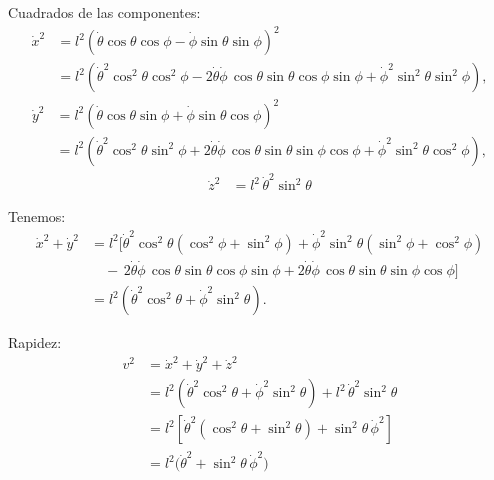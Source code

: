 \documentclass{article}
\begin{document}
Cuadrados de las componentes:
\begin{equation}
\begin{split}
\dot x^2
&= l^2\!\left(\dot\theta\cos\theta\cos\phi - \dot\phi\sin\theta\sin\phi\right)^2\\
&= l^2\!\left(
\dot\theta^2\cos^2\theta\cos^2\phi
-2\dot\theta\dot\phi\,\cos\theta\sin\theta\cos\phi\sin\phi
+\dot\phi^2\sin^2\theta\sin^2\phi
\right),
\end{split}\label{eq:xdot2}
\end{equation}
\begin{equation}
\begin{split}
\dot y^2
&= l^2\!\left(\dot\theta\cos\theta\sin\phi + \dot\phi\sin\theta\cos\phi\right)^2\\
&= l^2\!\left(
\dot\theta^2\cos^2\theta\sin^2\phi
+2\dot\theta\dot\phi\,\cos\theta\sin\theta\sin\phi\cos\phi
+\dot\phi^2\sin^2\theta\cos^2\phi
\right),
\end{split}\label{eq:ydot2}
\end{equation}
\begin{equation}
\begin{split}
\dot z^2
&= l^2\,\dot\theta^2\sin^2\theta 
\end{split}\label{eq:zdot2}
\end{equation}

Tenemos: 
\begin{equation}
\begin{split}
\dot x^2+\dot y^2
&= l^2\Big[
\dot\theta^2\cos^2\theta(\cos^2\phi+\sin^2\phi)
+\dot\phi^2\sin^2\theta(\sin^2\phi+\cos^2\phi)\\
&\quad -\,2\dot\theta\dot\phi\,\cos\theta\sin\theta\cos\phi\sin\phi
+2\dot\theta\dot\phi\,\cos\theta\sin\theta\sin\phi\cos\phi
\Big] \\
&= l^2\left(\dot\theta^2\cos^2\theta+\dot\phi^2\sin^2\theta\right).
\end{split}\label{eq:suma-xy}
\end{equation}

Rapidez:
\begin{equation}
\begin{split}
v^2
&= \dot x^2+\dot y^2+\dot z^2 \\
&= l^2\left(\dot\theta^2\cos^2\theta+\dot\phi^2\sin^2\theta\right)
  + l^2\,\dot\theta^2\sin^2\theta \\
&= l^2\left[\dot\theta^2(\cos^2\theta+\sin^2\theta)
            + \sin^2\theta\,\dot\phi^2\right] \\
&= l^{2}\bigl(\dot\theta^{2}+\sin^{2}\theta\,\dot\phi^{2}\bigr)
\end{split}\label{eq:v2}
\end{equation}
\end{document}
